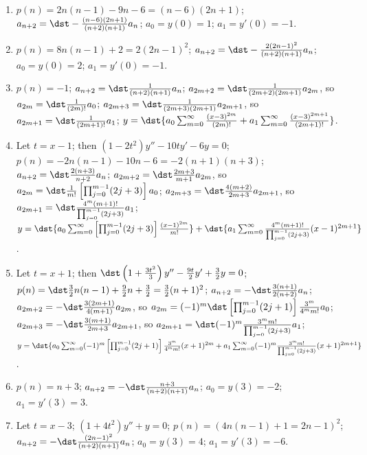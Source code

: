 \documentclass[openany]{book}
\newenvironment{sectionSolutions}{
 \begin{enumerate}[item-label={\thesection.\arabic{enumi}.}]
}{
 \end{enumerate}
}
\begin{document}
\begin{sectionSolutions}
\item
$p(n)=2n(n-1)-9n-6=(n-6)(2n+1)$;
$a_{n+2}=\dst-\frac{(n-6)(2n+1)}{(n+2)(n+1)}a_n$;
$a_0=y(0)=1$; $a_1=y'(0)=-1$.


\addtocounter{enumi}{-1}
\item%
$p(n)=8n(n-1)+2=2(2n-1)^2$;
$a_{n+2}=\dst-\frac{2(2n-1)^2}{(n+2)(n+1)}a_n$;
$a_0=y(0)=2$; $a_1=y'(0)=-1$.


\addtocounter{enumi}{1}
\item%
$p(n)=-1$;
$a_{n+2}=\dst\frac{1}{(n+2)(n+1)}a_n$;
$a_{2m+2}=\dst\frac{1}{(2m+2)(2m+1)}a_{2m}$, so
$a_{2m}=\dst\frac{1}{(2m)!}a_0$;
$a_{2m+3}=\dst\frac{1}{(2m+3)(2m+1)}a_{2m+1}$,
so $a_{2m+1}=\dst\frac{1}{(2m+1)!}a_1$;
$y=\dst{a_0\sum_{m=0}^\infty\frac{(x-3)^{2m}}{(2m)!}+a_1\sum_{m=0}^\infty
\frac{(x-3)^{2m+1}}{(2m+1)!}}$.



\item
Let $t=x-1$;  then $(1-2t^2)y''-10ty'-6y=0$;
$p(n)=-2n(n-1)-10n-6=-2(n+1)(n+3)$;
$a_{n+2}=\dst\frac{2(n+3)}{ n+2}a_n$;
$a_{2m+2}=\dst\frac{2m+3}{ m+1}a_{2m}$, so
$a_{2m}=\dst\frac{1}{ m!}\left[\prod_{j=0}^{m-1}(2j+3)\right]a_0$;
$a_{2m+3}=\dst\frac{4(m+2)}{ 2m+3}a_{2m+1}$,
so $a_{2m+1}=\dst\frac{4^m(m+1)!}{\prod_{j=0}^{m-1}(2j+3)}a_1$;
$y=\dst{a_0\sum_{m=0}^\infty \left[\prod_{j=0}^{m-1}(2j+3)\right]\frac{
(x-1)^{2m}}{ m!}}+\dst{a_1\sum_{m=0}^\infty
\frac{4^m(m+1)!}{\prod_{j=0}^{m-1}(2j+3)}(x-1)^{2m+1}}$.



\item
Let $t=x+1$;  then
$\dst\left(1+\frac{3t^2}{3}\right)y''-\frac{9t}{2}y'+\frac{3}{2}y=0$;
$p(n)=\dst\frac{3}{2}n(n-1)+\frac{9}{2}n+\frac{3}{2}=\frac{3}{2}(n+1)^2$;
$a_{n+2}=-\dst\frac{3(n+1)}{2(n+2)}a_n$;
$a_{2m+2}=-\dst\frac{3(2m+1)}{4(m+1)}a_{2m}$, so
$a_{2m}=(-1)^m\dst\left[\prod_{j=0}^{m-1}(2j+1)\right]\frac{3^m}{4^mm!}a_0$;
$a_{2m+3}=-\dst\frac{3(m+1)}{2m+3}a_{2m+1}$,
so $a_{2m+1}=\dst(-1)^m\frac{3^mm!}{\prod_{j=0}^{m-1}(2j+3)}a_1$;\\
$y=\dst{a_0\sum_{m=0}^\infty(-1)^m\left[\prod_{j=0}^{m-1}(2j+1)\right]
\frac{3^m}{4^mm!}(x+1)^{2m}+a_1\sum_{m=0}^\infty(-1)^m\frac{3^mm!}{
\prod_{j=0}^{m-1}(2j+3)}(x+1)^{2m+1}}$.


\item
$p(n)=n+3$;
$a_{n+2}=-\dst\frac{n+3}{(n+2)(n+1)}a_n$;
$a_0=y(3)=-2$; $a_1=y'(3)=3$.



\item
Let $t=x-3$; $(1+4t^2)y''+y=0$;
$p(n)=(4n(n-1)+1=2n-1)^2$;
$a_{n+2}=-\dst\frac{(2n-1)^2}{(n+2)(n+1)}a_n$;
$a_0=y(3)=4$; $a_1=y'(3)=-6$.






\end{sectionSolutions}
\end{document}
